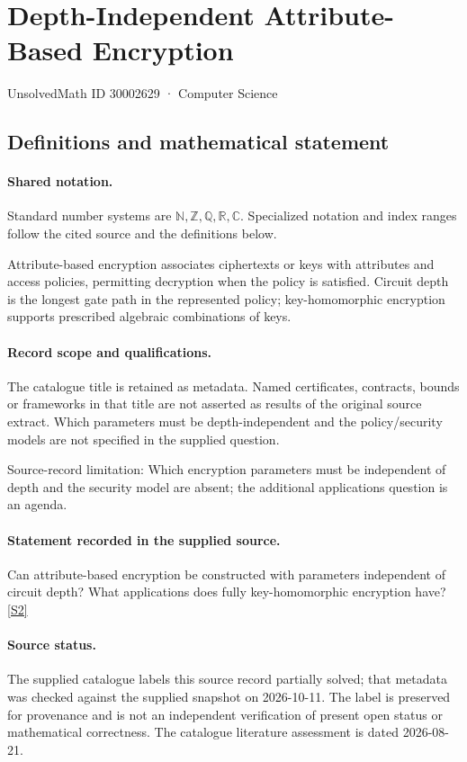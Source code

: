 \documentclass[11pt]{article}
\newcommand{\sref}[2]{\hyperlink{source:#1:#2}{[S#2]}}
\begin{document}
\setcounter{section}{30002628}
\section{Depth-Independent Attribute-Based Encryption}\label{30002629}
{\small\sffamily UnsolvedMath ID 30002629 · Computer Science}
\subsection{Definitions and mathematical statement}

\paragraph{Shared notation.}Standard number systems are $\mathbb N,\mathbb Z,\mathbb Q,\mathbb R,\mathbb C$. Specialized notation and index ranges follow the cited source and the definitions below.


Attribute-based encryption associates ciphertexts or keys with attributes and access policies, permitting decryption when the policy is satisfied. Circuit depth is the longest gate path in the represented policy; key-homomorphic encryption supports prescribed algebraic combinations of keys.
\paragraph{Record scope and qualifications.}
The catalogue title is retained as metadata. Named certificates, contracts, bounds or frameworks in that title are not asserted as results of the original source extract.
Which parameters must be depth-independent and the policy/security models are not specified in the supplied question.

Source-record limitation: Which encryption parameters must be independent of depth and the security model are absent; the additional applications question is an agenda.
\paragraph{Statement recorded in the supplied source.}
Can attribute-based encryption be constructed with parameters independent of circuit depth? What applications does fully key-homomorphic encryption have? \sref{30002629}{2}
\paragraph{Source status.}
The supplied catalogue labels this source record partially solved; that metadata was checked against the supplied snapshot on 2026-10-11. The label is preserved for provenance and is not an independent verification of present open status or mathematical correctness. The catalogue literature assessment is dated 2026-08-21.
\end{document}
